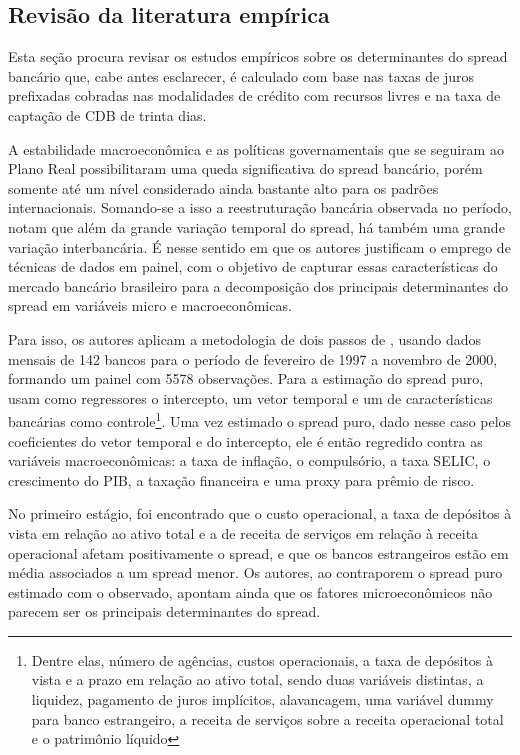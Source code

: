 \documentclass[a4paper,
               article,
               12pt,
               openany,
               oneside,
               english,
               brazil]{abntex2}
\numberwithin{equation}{section}
\begin{document}
\subsection{Revisão da literatura empírica}

    Esta seção procura revisar os estudos empíricos sobre os determinantes do spread bancário que, cabe antes esclarecer, é calculado com base nas taxas de juros prefixadas cobradas nas modalidades de crédito com recursos livres e na taxa de captação de CDB de trinta dias.

    A estabilidade macroeconômica e as políticas governamentais que se seguiram ao Plano Real possibilitaram uma queda significativa do spread bancário, porém somente até um nível considerado ainda bastante alto para os padrões internacionais. Somando-se a isso a reestruturação bancária observada no período,  notam que além da grande variação temporal do spread, há também uma grande variação interbancária. É nesse sentido em que os autores justificam o emprego de técnicas de dados em painel, com o objetivo de capturar essas características do mercado bancário brasileiro para a decomposição dos principais determinantes do spread em variáveis micro e macroeconômicas.

    Para isso, os autores aplicam a metodologia de dois passos de , usando dados mensais de 142 bancos para o período de fevereiro de 1997 a novembro de 2000, formando um painel com 5578 observações. Para a estimação do spread puro, usam como regressores o intercepto, um vetor temporal e um de características bancárias como controle\footnote{Dentre elas, número de agências, custos operacionais, a taxa de depósitos à vista e a prazo em relação ao ativo total, sendo duas variáveis distintas, a liquidez, pagamento de juros implícitos, alavancagem, uma variável dummy para banco estrangeiro, a receita de serviços sobre a receita operacional total e o patrimônio líquido}. Uma vez estimado o spread puro, dado nesse caso pelos coeficientes do vetor temporal e do intercepto, ele é então regredido contra as variáveis macroeconômicas: a taxa de inflação, o compulsório, a taxa SELIC, o crescimento do PIB, a taxação financeira e uma proxy para prêmio de risco.

    No primeiro estágio, foi encontrado que o custo operacional, a taxa de depósitos à vista em relação ao ativo total e a de receita de serviços em relação à receita operacional afetam positivamente o spread, e que os bancos estrangeiros estão em média associados a um spread menor. Os autores, ao contraporem o spread puro estimado com o observado, apontam ainda que os fatores microeconômicos não parecem ser os principais determinantes do spread.
    
\end{document}
